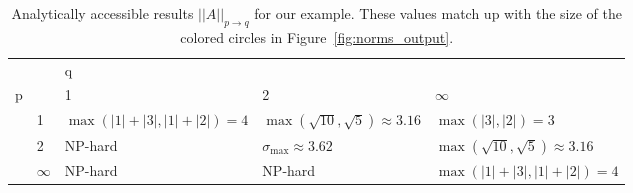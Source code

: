 \documentclass{article}
\begin{document}
\begin{table}[ht]
\caption{Analytically accessible results $||A||_{p \to q}$ for our example. These values match up with the size of the colored circles in Figure~\ref{fig:norms_output}.}
\begin{tabular}{ll|p{3cm}p{3cm}p{3cm}}
                          & & \multicolumn{3}{l}{ \hspace{5cm} q} \\ 
\multirow{4}{*}{p} &                       & 1 & 2  & $\infty$ \\ \cline{2-5}
                          & 1 & $\max(|1| + |3|, |1| + |2|) = 4$ & $\max(\sqrt{10}, \sqrt{5}) \approx 3.16$ & $\max(|3|, |2|) = 3$ \\
                          & 2                     & NP-hard & $\sigma_\text{max} \approx 3.62$  & $\max(\sqrt{10}, \sqrt{5}) \approx 3.16$ \\
                          & $\infty$ & NP-hard & NP-hard & $\max(|1| + |3|, |1| + |2|) = 4$    
\end{tabular}
\label{tab:example_induced_norms}
\end{table}
\end{document}
